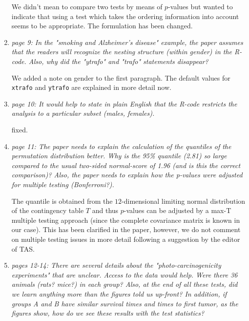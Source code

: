 \documentclass[11pt]{article}
\begin{document}
\begin{enumerate}
We didn't mean to compare two tests by means of $p$-values but wanted to
indicate that using a test which takes the ordering information into account
seems to be appropriate. The formulation has been changed.

\item \textsl{page 9:  In the "smoking and Alzheimer's disease" example, the paper assumes that the 
              readers will recognize the nesting structure (within gender) in the R-code. Also, 
              why did the "ytrafo" and "trafo" statements disappear? }
 
We added a note on gender to the first paragraph. The default values for
\texttt{xtrafo} and \texttt{ytrafo} are explained in more detail now.

\item \textsl{page 10:  It would help to state in plain English that the R-code restricts the 
              analysis to a particular subset (males, females).}
 
fixed.

\item \textsl{page 11:  The paper needs to explain the calculation of the quantiles of the 
              permutation distribution better. Why is the 95\% quantile (2.81) so large compared to the 
              usual two-sided normal-score of 1.96 (and is this the correct comparison)? Also, 
              the paper needs to explain how the p-values were adjusted for multiple testing 
              (Bonferroni?).}

The quantile is obtained from the $12$-dimensional limiting normal distribution
of the contingency table $T$ and thus $p$-values can be adjusted by a
max-T multiple testing approach (since the complete covariance matrix is
known in our case). This has been clarified in the paper, however, we do not
comment on multiple testing issues in more detail following a suggestion by
the editor of TAS.
 
\item \textsl{pages 12-14:  There are several details about the "photo-carcinogenicity experiments" 
              that are unclear. Access to the data would help. Were there 36 animals (rats? mice?) 
              in each group? Also, at the end of all these tests, did we learn anything more than the 
              figures told us up-front? 
              In addition, if groups A and B have similar survival times and times to first tumor, 
              as the figures show, how do we see these results with the test statistics? }


\end{enumerate}
\end{document}
